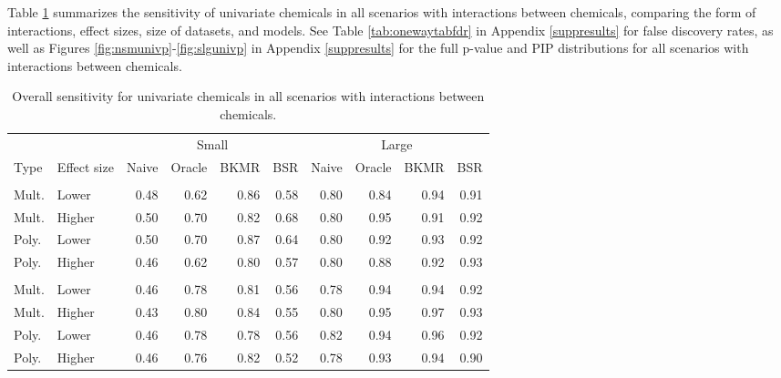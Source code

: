 \documentclass[12pt, twoside]{amherstthesis}
\begin{document}
Table \ref{tab:onewaytabsens} summarizes the sensitivity of univariate chemicals in all scenarios with interactions between chemicals, comparing the form of interactions, effect sizes, size of datasets, and models. See Table \ref{tab:onewaytabfdr} in Appendix \ref{suppresults} for false discovery rates, as well as Figures \ref{fig:nsmunivp}-\ref{fig:slgunivp} in Appendix \ref{suppresults} for the full p-value and PIP distributions for all scenarios with interactions between chemicals.
\begin{table}

\caption{\label{tab:onewaytabsens}Overall sensitivity for univariate chemicals in all scenarios with interactions between chemicals.}
\centering
\begin{tabular}[t]{llrrrrrrrr}
\toprule
\multicolumn{2}{c}{ } & \multicolumn{4}{c}{Small} & \multicolumn{4}{c}{Large} \\
\cmidrule(l{3pt}r{3pt}){3-6} \cmidrule(l{3pt}r{3pt}){7-10}
Type & Effect size & Naive & Oracle & BKMR & BSR & Naive & Oracle & BKMR & BSR\\
\midrule
\addlinespace[0.3em]
\multicolumn{10}{l}{\textbf{Hg-Ni}}\\
\hspace{1em}Mult. & Lower & 0.48 & 0.62 & 0.86 & 0.58 & 0.80 & 0.84 & 0.94 & 0.91\\
\hspace{1em}Mult. & Higher & 0.50 & 0.70 & 0.82 & 0.68 & 0.80 & 0.95 & 0.91 & 0.92\\
\hspace{1em}Poly. & Lower & 0.50 & 0.70 & 0.87 & 0.64 & 0.80 & 0.92 & 0.93 & 0.92\\
\hspace{1em}Poly. & Higher & 0.46 & 0.62 & 0.80 & 0.57 & 0.80 & 0.88 & 0.92 & 0.93\\
\addlinespace[0.3em]
\multicolumn{10}{l}{\textbf{Cd-As}}\\
\hspace{1em}Mult. & Lower & 0.46 & 0.78 & 0.81 & 0.56 & 0.78 & 0.94 & 0.94 & 0.92\\
\hspace{1em}Mult. & Higher & 0.43 & 0.80 & 0.84 & 0.55 & 0.80 & 0.95 & 0.97 & 0.93\\
\hspace{1em}Poly. & Lower & 0.46 & 0.78 & 0.78 & 0.56 & 0.82 & 0.94 & 0.96 & 0.92\\
\hspace{1em}Poly. & Higher & 0.46 & 0.76 & 0.82 & 0.52 & 0.78 & 0.93 & 0.94 & 0.90\\

\end{tabular}
\end{table}
\end{document}
